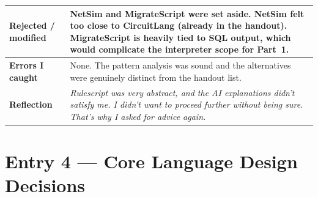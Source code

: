 \documentclass[a4paper,10pt]{article}
\begin{document}
\begin{tabular}{|
    >{\bfseries}m{3.5cm}|
    m{10cm}|
}
\hline
\rowcolor{white}
Rejected / modified & NetSim and MigrateScript were set aside. NetSim felt too close to CircuitLang (already in the handout). MigrateScript is heavily tied to SQL output, which would complicate the interpreter scope for Part~1. \\
\hline
\rowcolor{altrow}
Errors I caught   & None. The pattern analysis was sound and the alternatives were genuinely distinct from the handout list. \\
\hline
\rowcolor{white}
Reflection & \textit{Rulescript was very abstract, and the AI explanations didn't satisfy me. I didn't want to proceed further without being sure. That's why I asked for advice again.} \\
\hline
\end{tabular}

\newpage

\section{Entry 4 --- Core Language Design Decisions}
\end{document}
